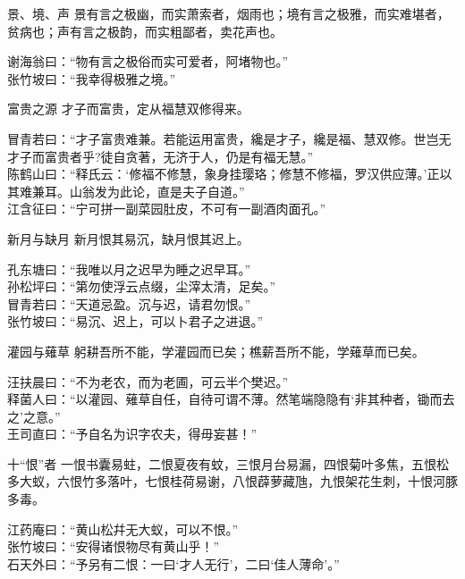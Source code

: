 \begin{yulu}{景、境、声}
景有言之极幽，而实萧索者，烟雨也；境有言之极雅，而实难堪者，贫病也；声有言之极韵，而实粗鄙者，卖花声也。
\begin{comments}
谢海翁曰：“物有言之极俗而实可爱者，阿堵物也。” \\
张竹坡曰：“我幸得极雅之境。”
\end{comments}
\end{yulu}

\begin{yulu}{富贵之源}
才子而富贵，定从福慧双修得来。
\begin{comments}
冒青若曰：“才子富贵难兼。若能运用富贵，纔是才子，纔是福、慧双修。世岂无才子而富贵者乎?徒自贪著，无济于人，仍是有福无慧。” \\
陈鹤山曰：“释氏云：‘修福不修慧，象身挂璎珞；修慧不修福，罗汉供应薄。’正以其难兼耳。山翁发为此论，直是夫子自道。” \\
江含征曰：“宁可拼一副菜园肚皮，不可有一副酒肉面孔。”
\end{comments}
\end{yulu}


\begin{yulu}{新月与缺月}
新月恨其易沉，缺月恨其迟上。
\begin{comments}
孔东塘曰：“我唯以月之迟早为睡之迟早耳。” \\
孙松坪曰：“第勿使浮云点缀，尘滓太清，足矣。” \\
冒青若曰：“天道忌盈。沉与迟，请君勿恨。” \\
张竹坡曰：“易沉、迟上，可以卜君子之进退。”
\end{comments}
\end{yulu}

\begin{yulu}{灌园与薙草}
躬耕吾所不能，学灌园而已矣；樵薪吾所不能，学薙草而已矣。
\begin{comments}
汪扶晨曰：“不为老农，而为老圃，可云半个樊迟。” \\
释菌人曰：“以灌园、薙草自任，自待可谓不薄。然笔端隐隐有‘非其种者，锄而去之’之意。” \\
王司直曰：“予自名为识字农夫，得毋妄甚！”
\end{comments}
\end{yulu}

\begin{yulu}{十“恨”者}
一恨书囊易蛀，二恨夏夜有蚊，三恨月台易漏，四恨菊叶多焦，五恨松多大蚁，六恨竹多落叶，七恨桂荷易谢，八恨薜萝藏虺，九恨架花生刺，十恨河豚多毒。
\begin{comments}
江药庵曰：“黄山松幷无大蚁，可以不恨。” \\
张竹坡曰：“安得诸恨物尽有黄山乎！” \\
石天外曰：“予另有二恨：一曰‘才人无行’，二曰‘佳人薄命’。”
\end{comments}
\end{yulu}

